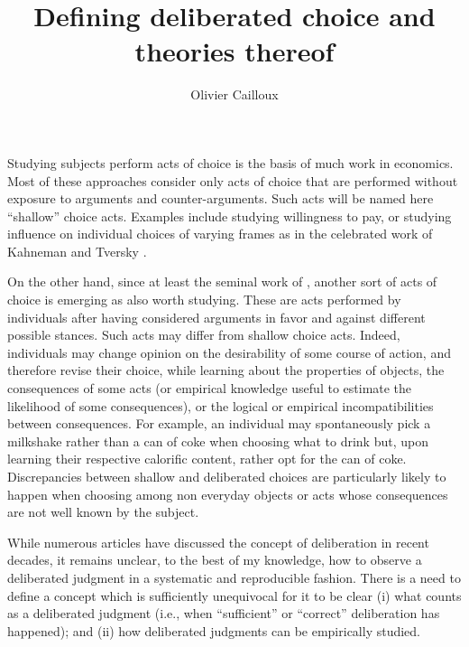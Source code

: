 \documentclass[version=last, pagesize, twoside=off, bibliography=totoc, DIV=calc, fontsize=12pt, a4paper, french, english]{scrartcl}
\begin{document}
\title{Defining deliberated choice and theories thereof}
\author{Olivier Cailloux}
\date{}
\makeatletter
{}
\makeatother
\maketitle

Studying subjects perform acts of choice is the basis of much work in economics.
Most of these approaches consider only acts of choice that are performed without exposure to arguments and counter-arguments. Such acts will be named here “shallow” choice acts. 
Examples include studying willingness to pay, or studying influence on individual choices of varying frames as in the celebrated work of Kahneman and Tversky \citep{bell_descriptive_1988, kahneman_thinking_2012}.

On the other hand, since at least the seminal work of \citet{fishkin_when_2011}, another sort of acts of choice is emerging as also worth studying.
These are acts performed by individuals 
after having considered arguments in favor and against different possible stances. 
Such acts may differ from shallow choice acts. 
Indeed, individuals may change opinion on the desirability of some course of action, and therefore revise their choice, while learning about the properties of objects, the consequences of some acts (or empirical knowledge useful to estimate the likelihood of some consequences), or the logical or empirical incompatibilities between consequences. 
For example, an individual may spontaneously pick a milkshake rather than a can of coke when choosing what to drink but, upon learning their respective calorific content, rather opt for the can of coke.
Discrepancies between shallow and deliberated choices are particularly likely to happen when choosing among non everyday objects or acts whose consequences are not well known by the subject. 

While numerous articles have discussed the concept of deliberation in recent decades, it remains unclear, to the best of my knowledge, how to observe a deliberated judgment in a systematic and reproducible fashion. 
There is a need to define a concept which is sufficiently unequivocal for it to be clear 
(i) what counts as a deliberated judgment (i.e., when “sufficient” \citep{meinard_justification_2020} or “correct” deliberation has happened); 
and (ii) how deliberated judgments can be empirically studied.
\end{document}
